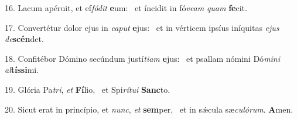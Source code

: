 16. Lacum apéruit, et ef\textit{fó}\textit{dit} \textbf{e}um: \ast\  et íncidit in fó\textit{ve}\textit{am} \textit{quam} \textbf{fe}cit.\

17. Convertétur dolor ejus in \textit{ca}\textit{put} \textbf{e}jus: \ast\  et in vérticem ipsíus iníquitas \textit{e}\textit{jus} \textit{de}\textbf{scén}det.\

18. Confitébor Dómino secúndum justí\textit{ti}\textit{am} \textbf{e}jus: \ast\  et psallam nómini Dó\textit{mi}\textit{ni} \textit{al}\textbf{tís}\textbf{si}mi.\

19. Glória Pa\textit{tri}, \textit{et} \textbf{Fí}lio, \ast\  et Spi\textit{rí}\textit{tu}\textit{i} \textbf{Sanc}to.\

20. Sicut erat in princípio, et \textit{nunc}, \textit{et} \textbf{sem}per, \ast\  et in sǽcula sæ\textit{cu}\textit{ló}\textit{rum}. \textbf{A}men.\

